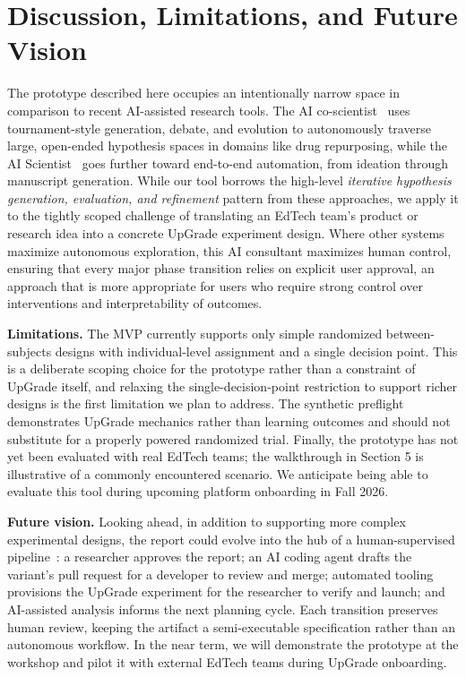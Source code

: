 \documentclass[manuscript,screen]{acmart}
\begin{document}
\section{Discussion, Limitations, and Future Vision}

The prototype described here occupies an intentionally narrow space in comparison to recent AI-assisted research tools. The AI co-scientist~\cite{ai-coscientist} uses tournament-style generation, debate, and evolution to autonomously traverse large, open-ended hypothesis spaces in domains like drug repurposing, while the AI Scientist~\cite{end-to-end-ai-research} goes further toward end-to-end automation, from ideation through manuscript generation. While our tool borrows the high-level \emph{iterative hypothesis generation, evaluation, and refinement} pattern from these approaches, we apply it to the tightly scoped challenge of translating an EdTech team's product or research idea into a concrete UpGrade experiment design. Where other systems maximize autonomous exploration, this AI consultant maximizes human control, ensuring that every major phase transition relies on explicit user approval, an approach that is more appropriate for users who require strong control over interventions and interpretability of outcomes.

\textbf{Limitations.} The MVP currently supports only simple randomized between-subjects designs with individual-level assignment and a single decision point. This is a deliberate scoping choice for the prototype rather than a constraint of UpGrade itself, and relaxing the single-decision-point restriction to support richer designs is the first limitation we plan to address. The synthetic preflight demonstrates UpGrade mechanics rather than learning outcomes and should not substitute for a properly powered randomized trial. Finally, the prototype has not yet been evaluated with real EdTech teams; the walkthrough in Section 5 is illustrative of a commonly encountered scenario. We anticipate being able to evaluate this tool during upcoming platform onboarding in Fall 2026. 

\textbf{Future vision.} Looking ahead, in addition to supporting more complex experimental designs, the report could evolve into the hub of a human-supervised pipeline~\cite{end-to-end-ai-research, asi-evolve}: a researcher approves the report; an AI coding agent drafts the variant's pull request for a developer to review and merge; automated tooling provisions the UpGrade experiment for the researcher to verify and launch; and AI-assisted analysis informs the next planning cycle. Each transition preserves human review, keeping the artifact a semi-executable specification rather than an autonomous workflow. In the near term, we will demonstrate the prototype at the workshop and pilot it with external EdTech teams during UpGrade onboarding.



\end{document}
